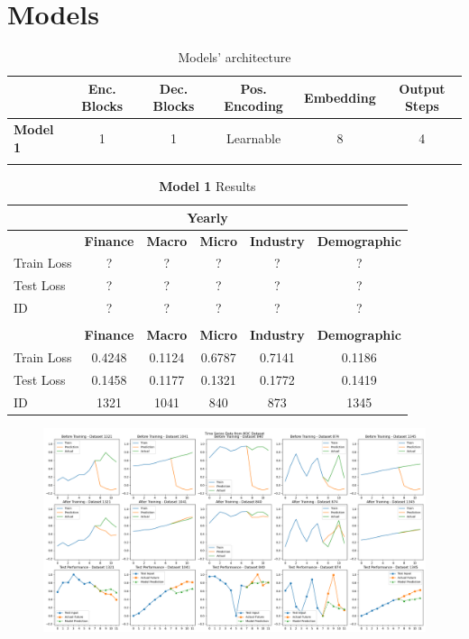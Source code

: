 \documentclass{article}
\begin{document}
	
	\section*{Models}
	
	\begin{table}[h!]
		\centering
		\caption*{Models' architecture}
		\begin{tabular}{@{}lccccc@{}}
			\midrule[0.2pt]
			& \textbf{Enc. Blocks} & \textbf{Dec. Blocks} & \textbf{Pos. Encoding} & \textbf{Embedding} & \textbf{Output Steps} \\
			\midrule[0.2pt]
			\textbf{Model 1} & 1 & 1 & Learnable & 8 & 4 \\
			\addlinespace[16pt]
		\end{tabular}
	\end{table}
	
	\begin{table}[h!]
		\centering
		\caption*{\textbf{Model 1} Results}
		\begin{tabular}{@{}lccccc@{}}
			\multicolumn{6}{c}{\textbf{Yearly}} \\
			\midrule[0.2pt]
				& \textbf{Finance} & \textbf{Macro} & \textbf{Micro} & \textbf{Industry} & \textbf{Demographic} \\
			\midrule[0.2pt]
			Train Loss & ? & ? & ? & ? & ? \\
			Test Loss  & ? & ? & ? & ? & ? \\[4pt]
			ID         & ? & ? & ? & ? & ? \\
			\addlinespace[16pt]
			
			\multicolumn{6}{c}{\textbf{Quarterly}} \\
			\midrule[1pt]
			& \textbf{Finance} & \textbf{Macro} & \textbf{Micro} & \textbf{Industry} & \textbf{Demographic} \\
			\midrule[0.2pt]
			Train Loss & 0.4248 & 0.1124 & 0.6787 & 0.7141 & 0.1186 \\
			Test Loss  & 0.1458 & 0.1177 & 0.1321 & 0.1772 & 0.1419 \\[4pt]
			ID         & 1321 & 1041 & 840 & 873 & 1345 \\
		\end{tabular}
	\end{table}
	
	\begin{figure}[htbp]
		\includegraphics[width=520pt]{model1.png}
	\end{figure}
	
\end{document}
